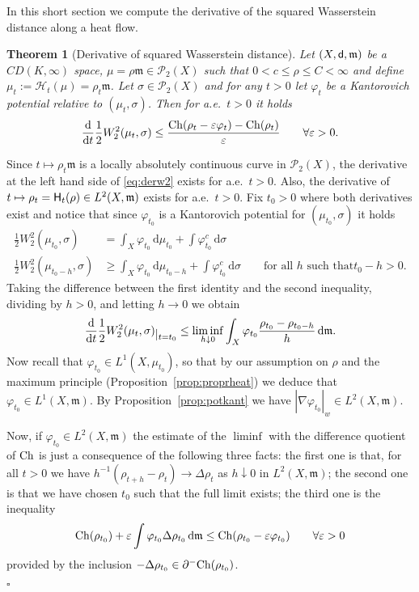 \documentclass[reqno,11pt]{article}
\numberwithin{equation}{section}
\newcommand{\C}{\mathbb{C}}
\newcommand{\mm}{{\mbox{\boldmath$m$}}}
\newcommand{\sfd}{{\sf d}}
\renewcommand{\d}{{\mathrm d}}
\newcommand{\restr}[1]{\lower3pt\hbox{$|_{#1}$}}
\newcommand{\eps}{\varepsilon}
\newcommand{\ProbabilitiesTwo}[1]{\mathscr P_2(#1)}     %
\newenvironment{proof}{\removelastskip\par\medskip   %
\noindent{\em Proof.}
\rm}{\penalty-20\null\hfill$\square$\par\medbreak}
\newtheorem{theorem}{Theorem}[section]
\newcommand{\probt}{\ProbabilitiesTwo}
\newcommand{\weakgrad}[1]{|\nabla #1|_w}                %
\renewcommand{\C}{{\rm Ch}}
\newcommand{\heatl}{{\sf H}}
\newcommand{\heatw}{{\mathscr H}}
\newcommand{\Deltam}{\Delta}
\renewcommand{\mm}{\mathfrak m}
\begin{document}
In this short section we compute the derivative of the squared
Wasserstein distance along a heat flow.

\begin{theorem}[Derivative of squared Wasserstein distance]
\label{thm:derw2} Let $(X,\sfd,\mm)$ be a $CD(K,\infty)$ space,
$\mu=\rho\mm\in\probt X$ such that $0<c\leq \rho\leq C<\infty$ and
define $\mu_t:=\heatw_t(\mu)=\rho_t\mm$. Let $\sigma\in\probt X$ and
for any $t>0$ let $\varphi_t$ be a Kantorovich potential relative to
$(\mu_t,\sigma)$. Then for a.e.~$t>0$ it holds
\begin{equation}
\label{eq:derw2} \frac{\d}{\d
t}\frac12W_2^2(\mu_t,\sigma)\leq\frac{\C(\rho_t-\eps\varphi_t)-\C(\rho_t)}\eps
\qquad\forall\eps>0.
\end{equation}
\end{theorem}
\begin{proof} Since $t\mapsto\rho_t\mm$ is a locally absolutely continuous curve in
$\probt X$, the derivative at the left hand side of \eqref{eq:derw2}
exists for a.e.~$t>0$. Also, the derivative of
$t\mapsto\rho_t=\heatl_t(\rho)\in L^2(X,\mm)$ exists for a.e.~$t>0$.
Fix $t_0>0$ where both derivatives exist and notice that since
$\varphi_{t_0}$ is a Kantorovich potential for $(\mu_{t_0},\sigma)$
it holds
\[
\begin{split}
\frac 12 W_2^2(\mu_{t_0},\sigma)&=\int_X\varphi_{t_0}\,\d\mu_{t_0}+\int\varphi_{t_0}^c\,\d\sigma\\
\frac 12
W_2^2(\mu_{t_0-h},\sigma)&\geq\int_X\varphi_{t_0}\,\d\mu_{t_0-h}+
\int\varphi_{t_0}^c\,\d\sigma\qquad\text{for all $h$ such that
$t_0-h> 0$.}
\end{split}
\]
Taking the difference between the first identity and the second
inequality, dividing by $h>0$, and letting $h\to 0$ we obtain
\[
\frac{\d}{\d t}\frac 12 W_2^2(\mu_{t},\sigma)\restr{t=t_0}
\leq\liminf_{h\downarrow 0}\int_X\varphi_{t_0}\frac{
\rho_{t_0}-\rho_{t_0-h}}{h}\,\d\mm.
\]
Now recall that $\varphi_{t_0}\in L^1(X,\mu_{t_0})$, so that by our
assumption on $\rho$ and the maximum principle
(Proposition~\ref{prop:proprheat}) we deduce that $\varphi_{t_0}\in
L^1(X,\mm)$. By Proposition~\ref{prop:potkant} we have $\weakgrad
{\varphi_{t_0}}\in L^2(X,\mm)$.

Now, if $\varphi_{t_0}\in L^2(X,\mm)$ the estimate of the $\liminf$
with the difference quotient of $\C$ is just a consequence of the
following three facts: the first one is that, for all $t>0$ we have
$h^{-1}(\rho_{t+h}-\rho_t)\to\Deltam\rho_t$ as $h\downarrow 0$ in
$L^2(X,\mm)$; the second one is that we have chosen $t_0$ such that
the full limit exists; the third one is the inequality
\[
\C(\rho_{t_0})+\eps\int\varphi_{t_0}\Deltam\rho_{t_0}\,\d\mm\leq\C(\rho_{t_0}-\eps\varphi_{t_0})
\qquad\forall\eps>0
\]
provided by the inclusion $-\Deltam
\rho_{t_0}\in\partial^-\C(\rho_{t_0})$.


\end{proof}
\end{document}
